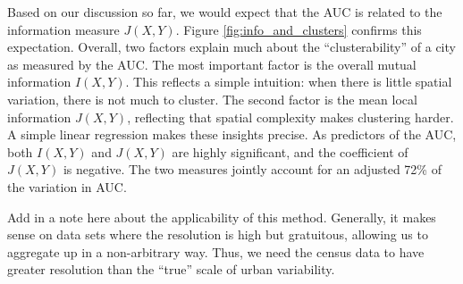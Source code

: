 	Based on our discussion so far, we would expect that the AUC is related to the information measure $J(X,Y)$. Figure \ref{fig:info_and_clusters} confirms this expectation. Overall, two factors explain much about the ``clusterability'' of a city as measured by the AUC. The most important factor is the overall mutual information $I(X,Y)$. This reflects a simple intuition: when there is little spatial variation, there is not much to cluster. The second factor is the mean local information $J(X,Y)$, reflecting that spatial complexity makes clustering harder. A simple linear regression makes these insights precise. As predictors of the AUC, both $I(X,Y)$ and $J(X,Y)$ are highly significant, and the coefficient of $J(X,Y)$ is negative. The two measures jointly account for an adjusted 72\% of the variation in AUC. 

	Add in a note here about the applicability of this method. Generally, it makes sense on data sets where the resolution is high but gratuitous, allowing us to aggregate up in a non-arbitrary way. Thus, we need the census data to have greater resolution than the ``true'' scale of urban variability. 